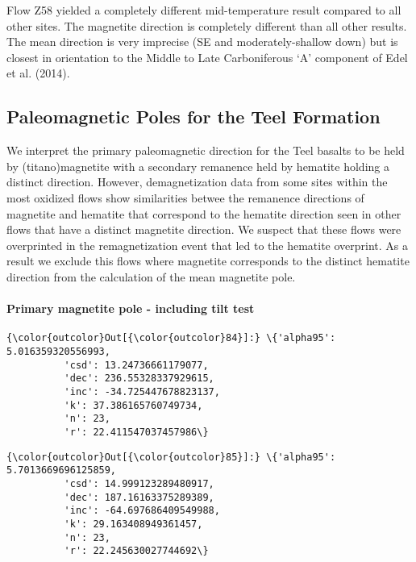 \documentclass[11pt]{article}
\begin{document}
    Flow Z58 yielded a completely different mid-temperature result compared
to all other sites. The magnetite direction is completely different than
all other results. The mean direction is very imprecise (SE and
moderately-shallow down) but is closest in orientation to the Middle to
Late Carboniferous `A' component of Edel et al. (2014).

    \subsection{Paleomagnetic Poles for the Teel
Formation}\label{paleomagnetic-poles-for-the-teel-formation}

    We interpret the primary paleomagnetic direction for the Teel basalts to
be held by (titano)magnetite with a secondary remanence held by hematite
holding a distinct direction. However, demagnetization data from some
sites within the most oxidized flows show similarities betwee the
remanence directions of magnetite and hematite that correspond to the
hematite direction seen in other flows that have a distinct magnetite
direction. We suspect that these flows were overprinted in the
remagnetization event that led to the hematite overprint. As a result we
exclude this flows where magnetite corresponds to the distinct hematite
direction from the calculation of the mean magnetite pole.

    \paragraph{Primary magnetite pole - including tilt
test}\label{primary-magnetite-pole---including-tilt-test}




            \begin{Verbatim}[commandchars=\\\{\}]
{\color{outcolor}Out[{\color{outcolor}84}]:} \{'alpha95': 5.016359320556993,
          'csd': 13.24736661179077,
          'dec': 236.55328337929615,
          'inc': -34.725447678823137,
          'k': 37.386165760749734,
          'n': 23,
          'r': 22.411547037457986\}
\end{Verbatim}
        

            \begin{Verbatim}[commandchars=\\\{\}]
{\color{outcolor}Out[{\color{outcolor}85}]:} \{'alpha95': 5.7013669696125859,
          'csd': 14.999123289480917,
          'dec': 187.16163375289389,
          'inc': -64.697686409549988,
          'k': 29.163408949361457,
          'n': 23,
          'r': 22.245630027744692\}
\end{Verbatim}
        
\end{document}
